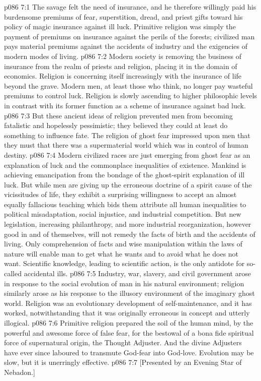 \vs p086 7:1 The savage felt the need of insurance, and he therefore willingly paid his burdensome premiums of fear, superstition, dread, and priest gifts toward his policy of magic insurance against ill luck. Primitive religion was simply the payment of premiums on insurance against the perils of the forests; civilized man pays material premiums against the accidents of industry and the exigencies of modern modes of living.
\vs p086 7:2 Modern society is removing the business of insurance from the realm of priests and religion, placing it in the domain of economics. Religion is concerning itself increasingly with the insurance of life beyond the grave. Modern men, at least those who think, no longer pay wasteful premiums to control luck. Religion is slowly ascending to higher philosophic levels in contrast with its former function as a scheme of insurance against bad luck.
\vs p086 7:3 But these ancient ideas of religion prevented men from becoming fatalistic and hopelessly pessimistic; they believed they could at least do something to influence fate. The religion of ghost fear impressed upon men that they must  that there was a supermaterial world which was in control of human destiny.
\vs p086 7:4 Modern civilized races are just emerging from ghost fear as an explanation of luck and the commonplace inequalities of existence. Mankind is achieving emancipation from the bondage of the ghost\hyp{}spirit explanation of ill luck. But while men are giving up the erroneous doctrine of a spirit cause of the vicissitudes of life, they exhibit a surprising willingness to accept an almost equally fallacious teaching which bids them attribute all human inequalities to political misadaptation, social injustice, and industrial competition. But new legislation, increasing philanthropy, and more industrial reorganization, however good in and of themselves, will not remedy the facts of birth and the accidents of living. Only comprehension of facts and wise manipulation within the laws of nature will enable man to get what he wants and to avoid what he does not want. Scientific knowledge, leading to scientific action, is the only antidote for so\hyp{}called accidental ills.
\vs p086 7:5 \pc Industry, war, slavery, and civil government arose in response to the social evolution of man in his natural environment; religion similarly arose as his response to the illusory environment of the imaginary ghost world. Religion was an evolutionary development of self\hyp{}maintenance, and it has worked, notwithstanding that it was originally erroneous in concept and utterly illogical.
\vs p086 7:6 Primitive religion prepared the soil of the human mind, by the powerful and awesome force of false fear, for the bestowal of a bona fide spiritual force of supernatural origin, the Thought Adjuster. And the divine Adjusters have ever since laboured to transmute God\hyp{}fear into God\hyp{}love. Evolution may be slow, but it is unerringly effective.
\vsetoff
\vs p086 7:7 [Presented by an Evening Star of Nebadon.]
